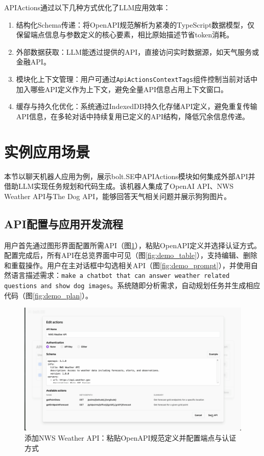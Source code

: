 APIActions通过以下几种方式优化了LLM应用效率：

\begin{enumerate}
  \item 结构化Schema传递：将OpenAPI规范解析为紧凑的TypeScript数据模型，仅保留端点信息与参数定义的核心要素，相比原始描述节省token消耗。
  
  \item 外部数据获取：LLM能透过提供的API，直接访问实时数据源，如天气服务或金融API。
  
  \item 模块化上下文管理：用户可通过\texttt{ApiActionsContextTags}组件控制当前对话中加入哪些API定义作为上下文，避免全量API信息占用上下文窗口。
  
  \item 缓存与持久化优化：系统通过IndexedDB持久化存储API定义，避免重复传输API信息，在多轮对话中持续复用已定义的API结构，降低冗余信息传递。
  \end{enumerate}

\section{实例应用场景}

本节以聊天机器人应用为例，展示bolt.SE中APIActions模块如何集成外部API并借助LLM实现任务规划和代码生成。该机器人集成了OpenAI API、NWS Weather API与The Dog API，能够回答天气相关问题并展示狗狗图片。

\subsection{API配置与应用开发流程}

用户首先通过图形界面配置所需API（图\ref{fig:demo_edit}），粘贴OpenAPI定义并选择认证方式。配置完成后，所有API在总览界面中可见（图\ref{fig:demo_table}），支持编辑、删除和重载操作。用户在主对话框中勾选相关API（图\ref{fig:demo_prompt}），并使用自然语言描述需求：\texttt{make a chatbot that can answer weather related questions and show dog images}。系统随即分析需求，自动规划任务并生成相应代码（图\ref{fig:demo_plan}）。

\begin{figure}[H]
  \centering
  \includegraphics[width=\textwidth]{figures/screenshots/api-actions/demo_edit_modal.png}
  \caption{添加NWS Weather API：粘贴OpenAPI规范定义并配置端点与认证方式}
  \label{fig:demo_edit}
\end{figure}

